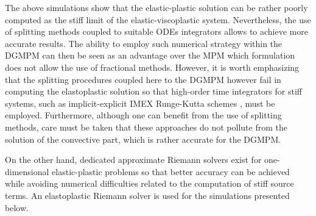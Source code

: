 The above simulations show that the elastic-plastic solution can be rather poorly computed as the stiff limit of the elastic-viscoplastic system.
Nevertheless, the use of splitting methods coupled to suitable ODEs integrators allows to achieve more accurate results.
The ability to employ such numerical strategy within the DGMPM can then be seen as an advantage over the MPM which formulation does not allow the use of fractional methods.
However, it is worth emphasizing that the splitting procedures coupled here to the DGMPM however fail in computing the elastoplastic solution so that high-order time integrators for stiff systems, such as implicit-explicit IMEX Runge-Kutta schemes \cite{Pareschi_stiff}, must be employed.
Furthermore, although one can benefit from the use of splitting methods, care must be taken that these approaches do not pollute from the solution of the convective part, which is rather accurate for the DGMPM.


On the other hand, dedicated approximate Riemann solvers exist for one-dimensional elastic-plastic problems so that better accuracy can be achieved while avoiding numerical difficulties related to the computation of stiff source terms. An elastoplastic Riemann solver is used for the simulations presented below.

